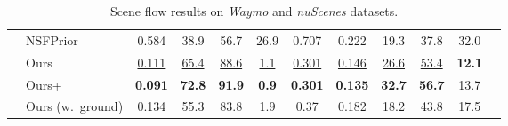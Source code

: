 \begin{table}[t]
{\begin{tabular}{clcccc|cccccc}
                                  & NSFPrior~\cite{li2021neural} &  0.584 & 38.9 & 56.7 & 26.9 & 0.707 & 0.222 & 19.3 & 37.8 & 32.0 \\
                                  \arrayrulecolor{lightgray}\cline{2-11}\arrayrulecolor{black}
                                  & Ours & \underline{0.111} & \underline{65.4} & \underline{88.6} & \underline{1.1} & \underline{0.301} & \underline{0.146} & \underline{26.6} & \underline{53.4} & \textbf{12.1} \\
                                  & Ours+ & \textbf{0.091} & \textbf{72.8} & \textbf{91.9} & \textbf{0.9} & \textbf{0.301} & \textbf{0.135} & \textbf{32.7} & \textbf{56.7} & \underline{13.7} \\
                                  & Ours (w.\ ground) & 0.134 & 55.3 & 83.8 & 1.9 & 0.37 & 0.182 & 18.2 & 43.8 & 17.5  \\   
    \bottomrule
    \end{tabular}
    }
	\caption{Scene flow results on \emph{Waymo} and \emph{nuScenes} datasets.}
	\label{tab:sf_main}
\end{table}


